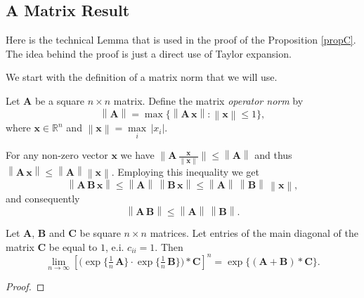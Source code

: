 \begin{appendices}

\chapter{A Matrix Result}

Here is the technical Lemma that is used in the proof of the Proposition \ref{propC}. The idea behind the proof is just a direct use of Taylor expansion.

We start with the definition of a matrix norm that we will use.
\begin{df}
Let $\bm{A}$ be a square $n \times n$ matrix. Define the matrix \textit{operator norm} by
\[\left\|\bm{A}\right\|=\max\{ \left\|\bm{A}\,\bm{x}\right\|:\left\|\bm{x}\right\|\leq 1\},\]
where $\bm{x}\in\mathbb{R}^n$ and $\left\|\bm{x}\right\|=\underset{i}{\max} \,|x_{i}|$.
\end{df}
\noindent For any non-zero vector $\bm{x}$ we have $\|\bm{A}\,\tfrac{\bm{x}}{\left\|\bm{x}\right\|}\|\leq \left\|\bm{A}\right\|$ and thus $\left\|\bm{A}\,\bm{x}\right\|\leq \left\|\bm{A}\right\|\left\|\bm{x}\right\|$. Employing this inequality we get
\[\left\|\bm{A}\,\bm{B}\,\bm{x}\right\|\leq\left\|\bm{A}\right\|\,\left\|\bm{B}\,\bm{x}\right\|\leq\left\|\bm{A}\right\|\,\left\|\bm{B}\right\|\,\left\|\bm{x}\right\|,\]
and consequently
\begin{equation}
\label{ineq}
\left\|\bm{A}\,\bm{B}\right\|\leq \left\|\bm{A}\right\|\,\left\|\bm{B}\right\|.
\end{equation}



\begin{lem}
\label{MatrixResult}
Let $\bm{A}$, $\bm{B}$ and $\bm{C}$ be square $n \times n$ matrices. Let entries of the main diagonal of the matrix $\bm{C}$ be equal to $1$, e.i. $c_{ii}=1$. Then
$$\lim_{n\rightarrow\infty}\left[\big(\exp\{\tfrac{1}{n}\,\bm{A}\}\cdot\exp\{\tfrac{1}{n}\,\bm{B}\}\big) \ast \bm{C}\right]^n=\exp\{(\bm{A}+\bm{B})\ast\bm{C}\}.$$
\end{lem}
\begin{proof}


\end{proof}
\end{appendices}
